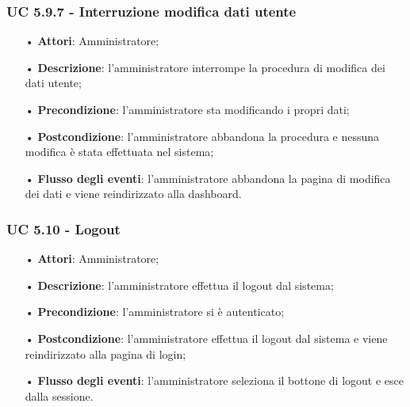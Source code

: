 \subsubsection{UC 5.9.7 - Interruzione modifica dati utente}
\begin{itemize}
	\item[•]\textbf{Attori}: Amministratore;
	\item[•]\textbf{Descrizione}: l'amministratore interrompe la procedura di modifica dei dati utente;
	\item[•]\textbf{Precondizione}: l'amministratore sta modificando i propri dati;
	\item[•]\textbf{Postcondizione}: l'amministratore abbandona la procedura e nessuna modifica è stata effettuata nel sistema; 
	\item[•]\textbf{Flusso degli eventi}: l'amministratore abbandona la pagina di modifica dei dati e viene reindirizzato alla dashboard.
\end{itemize}


\subsubsection{UC 5.10 - Logout}
\begin{itemize}
    \item[•] \textbf{Attori}: Amministratore;
    \item[•] \textbf{Descrizione}:  l'amministratore effettua il logout dal sistema;
    \item[•] \textbf{Precondizione}: l'amministratore si è autenticato;
    \item[•] \textbf{Postcondizione}: l’amministratore effettua il logout dal sistema e viene reindirizzato alla pagina di login;
    \item[•] \textbf{Flusso degli eventi}: l’amministratore seleziona il bottone di logout e esce dalla sessione.
\end{itemize}



